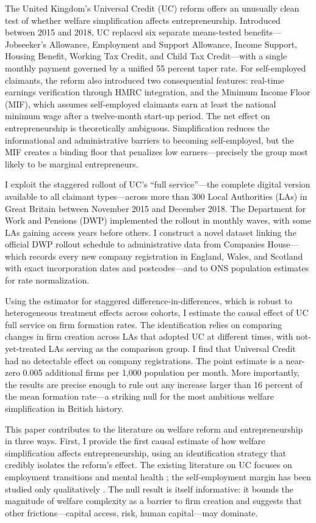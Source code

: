 \documentclass[12pt]{article}
\begin{document}
The United Kingdom's Universal Credit (UC) reform offers an unusually clean test of whether welfare simplification affects entrepreneurship. Introduced between 2015 and 2018, UC replaced six separate means-tested benefits---Jobseeker's Allowance, Employment and Support Allowance, Income Support, Housing Benefit, Working Tax Credit, and Child Tax Credit---with a single monthly payment governed by a unified 55 percent taper rate. For self-employed claimants, the reform also introduced two consequential features: real-time earnings verification through HMRC integration, and the Minimum Income Floor (MIF), which assumes self-employed claimants earn at least the national minimum wage after a twelve-month start-up period. The net effect on entrepreneurship is theoretically ambiguous. Simplification reduces the informational and administrative barriers to becoming self-employed, but the MIF creates a binding floor that penalizes low earners---precisely the group most likely to be marginal entrepreneurs.

I exploit the staggered rollout of UC's ``full service''---the complete digital version available to all claimant types---across more than 300 Local Authorities (LAs) in Great Britain between November 2015 and December 2018. The Department for Work and Pensions (DWP) implemented the rollout in monthly waves, with some LAs gaining access years before others. I construct a novel dataset linking the official DWP rollout schedule to administrative data from Companies House---which records every new company registration in England, Wales, and Scotland with exact incorporation dates and postcodes---and to ONS population estimates for rate normalization.

Using the \citet{callaway2021difference} estimator for staggered difference-in-differences, which is robust to heterogeneous treatment effects across cohorts, I estimate the causal effect of UC full service on firm formation rates. The identification relies on comparing changes in firm creation across LAs that adopted UC at different times, with not-yet-treated LAs serving as the comparison group. I find that Universal Credit had no detectable effect on company registrations. The point estimate is a near-zero 0.005 additional firms per 1,000 population per month. More importantly, the results are precise enough to rule out any increase larger than 16 percent of the mean formation rate---a striking null for the most ambitious welfare simplification in British history.

This paper contributes to the literature on welfare reform and entrepreneurship in three ways. First, I provide the first causal estimate of how welfare simplification affects entrepreneurship, using an identification strategy that credibly isolates the reform's effect. The existing literature on UC focuses on employment transitions \citep{dwp2024employment} and mental health \citep{brewer2024universal}; the self-employment margin has been studied only qualitatively \citep{griffiths2024going}. The null result is itself informative: it bounds the magnitude of welfare complexity as a barrier to firm creation and suggests that other frictions---capital access, risk, human capital---may dominate.
\end{document}

